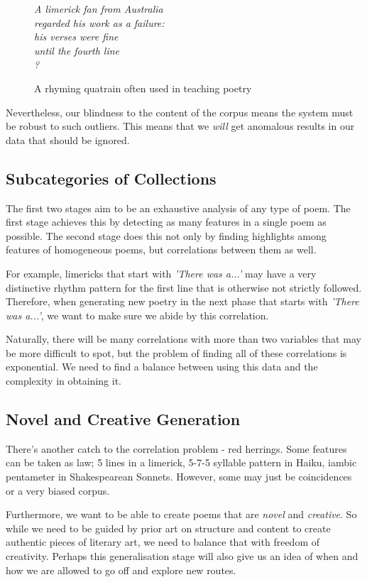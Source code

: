 \begin{figure}[h!]
\centering
\textit{
A limerick fan from Australia\\
regarded his work as a failure:\\
his verses were fine\\
until the fourth line\\
?
}
\caption{A rhyming quatrain often used in teaching poetry}
\label{fig:awkward-limerick}
\end{figure}
Nevertheless, our blindness to the content of the corpus means the system must be robust to such outliers. This means that we \textit{will} get anomalous results in our data that should be ignored.

\subsection{Subcategories of Collections}

The first two stages aim to be an exhaustive analysis of any type of poem. The first stage achieves this by detecting as many features in a single poem as possible. The second stage does this not only by finding highlights among features of homogeneous poems, but correlations between them as well.

For example, limericks that start with \textit{'There was a...'} may have a very distinctive rhythm pattern for the first line that is otherwise not strictly followed. Therefore, when generating new poetry in the next phase that starts with \textit{'There was a...'}, we want to make sure we abide by this correlation.

Naturally, there will be many correlations with more than two variables that may be more difficult to spot, but the problem of finding all of these correlations is exponential. We need to find a balance between using this data and the complexity in obtaining it.

\subsection{Novel and Creative Generation}

There's another catch to the correlation problem - red herrings. Some features can be taken as law; 5 lines in a limerick, 5-7-5 syllable pattern in Haiku, iambic pentameter in Shakespearean Sonnets. However, some may just be coincidences or a very biased corpus.

Furthermore, we want to be able to create poems that are \textit{novel} and \textit{creative}. So while we need to be guided by prior art on structure and content to create authentic pieces of literary art, we need to balance that with freedom of creativity. Perhaps this generalisation stage will also give us an idea of when and how we are allowed to go off and explore new routes.


